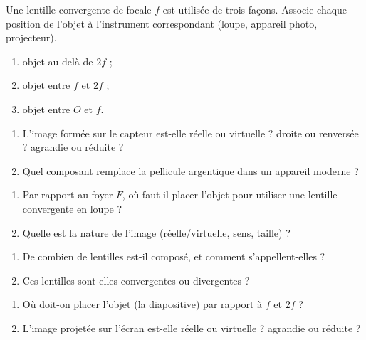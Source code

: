 \documentclass[11pt,a4paper]{article}
\begin{document}

\begin{exo}
Une lentille convergente de focale $f$ est utilisée de trois façons. Associe chaque position de
l'objet à l'instrument correspondant (loupe, appareil photo, projecteur).
\begin{enumerate}[label=\alph*)]
  \item objet au-delà de $2f$ ;
  \item objet entre $f$ et $2f$ ;
  \item objet entre $O$ et $f$.
\end{enumerate}
\end{exo}

\begin{exo}
\begin{enumerate}[label=\alph*)]
  \item L'image formée sur le capteur est-elle réelle ou virtuelle ? droite ou renversée ?
        agrandie ou réduite ?
  \item Quel composant remplace la pellicule argentique dans un appareil moderne ?
\end{enumerate}
\end{exo}

\begin{exo}[la loupe]
\begin{enumerate}[label=\alph*)]
  \item Par rapport au foyer $F$, où faut-il placer l'objet pour utiliser une lentille convergente en
        loupe ?
  \item Quelle est la nature de l'image (réelle/virtuelle, sens, taille) ?
\end{enumerate}
\end{exo}

\begin{exo}
\begin{enumerate}[label=\alph*)]
  \item De combien de lentilles est-il composé, et comment s'appellent-elles ?
  \item Ces lentilles sont-elles convergentes ou divergentes ?
\end{enumerate}
\end{exo}

\begin{exo}[le projecteur]
\begin{enumerate}[label=\alph*)]
  \item Où doit-on placer l'objet (la diapositive) par rapport à $f$ et $2f$ ?
  \item L'image projetée sur l'écran est-elle réelle ou virtuelle ? agrandie ou réduite ?
\end{enumerate}
\end{exo}
\end{document}
